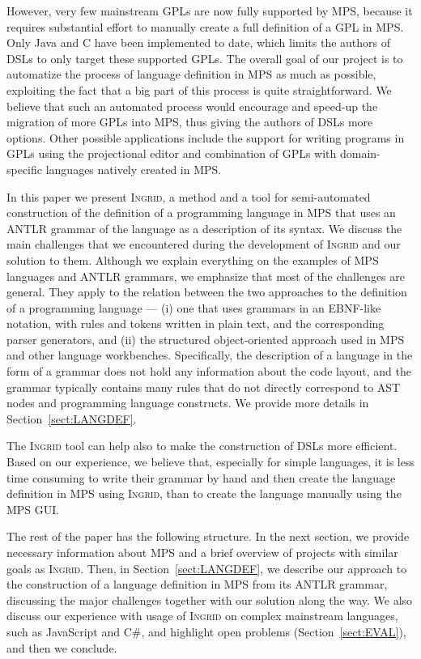However, very few mainstream GPLs are now fully supported by MPS, because it requires substantial effort to manually create a full definition of a GPL in MPS.
Only Java and C have been implemented to date, which limits the authors of DSLs to only target these supported GPLs.
The overall goal of our project is to automatize the process of language definition in MPS as much as possible, exploiting the fact that a big part of this process is quite straightforward.
We believe that such an automated process would encourage and speed-up the migration of more GPLs into MPS, thus giving the authors of DSLs more options.
Other possible applications include the support for writing programs in GPLs using the projectional editor and combination of GPLs with domain-specific languages natively created in MPS.

In this paper we present \textsc{Ingrid}, a method and a tool for semi-automated construction of the definition of a programming language in MPS that uses an ANTLR grammar of the language as a description of its syntax.
We discuss the main challenges that we encountered during the development of \textsc{Ingrid} and our solution to them.
 Although we explain everything on the examples of MPS languages and ANTLR grammars, we emphasize that most of the challenges are general. 
They apply to the relation between the two approaches to the definition of a programming language --- (i) one that uses grammars in an EBNF-like notation, with rules and tokens written in plain text, and the corresponding parser generators, and (ii) the structured object-oriented approach used in MPS and other language workbenches.
Specifically, the description of a language in the form of a grammar does not hold any information about the code layout, and the grammar typically contains many rules that do not directly correspond to AST nodes and programming language constructs.
We provide more details in Section~\ref{sect:LANGDEF}.

The \textsc{Ingrid} tool can help also to make the construction of DSLs more efficient.
Based on our experience, we believe that, especially for simple languages, it is less time consuming to write their grammar by hand and then create the language definition in MPS using \textsc{Ingrid}, than to create the language manually using the MPS GUI.


The rest of the paper has the following structure.
In the next section, we provide necessary information about MPS and a brief overview of projects with similar goals as \textsc{Ingrid}.
Then, in Section~\ref{sect:LANGDEF}, we describe our approach to the construction of a language definition in MPS from its ANTLR grammar, discussing the major challenges together with our solution along the way.
We also discuss our experience with usage of \textsc{Ingrid} on complex mainstream languages, such as JavaScript and C\#, and highlight open problems (Section~\ref{sect:EVAL}), and then we conclude.

